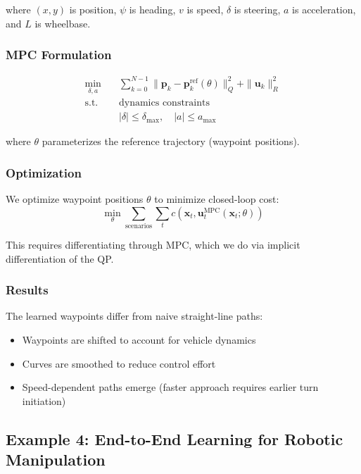 where $(x, y)$ is position, $\psi$ is heading, $v$ is speed, $\delta$ is steering, $a$ is acceleration, and $L$ is wheelbase.

\subsubsection{MPC Formulation}

\begin{equation}
\begin{aligned}
\min_{\delta, a} \quad & \sum_{k=0}^{N-1} \| \mathbf{p}_k - \mathbf{p}_k^{\text{ref}}(\theta) \|^2_Q + \| \mathbf{u}_k \|^2_R \\
\text{s.t.} \quad & \text{dynamics constraints} \\
& |\delta| \leq \delta_{\max}, \quad |a| \leq a_{\max}
\end{aligned}
\end{equation}

where $\theta$ parameterizes the reference trajectory (waypoint positions).

\subsubsection{Optimization}

We optimize waypoint positions $\theta$ to minimize closed-loop cost:
\begin{equation}
\min_\theta \sum_{\text{scenarios}} \sum_{t} c(\mathbf{x}_t, \mathbf{u}_t^{\text{MPC}}(\mathbf{x}_t; \theta))
\end{equation}

This requires differentiating through MPC, which we do via implicit differentiation of the QP.

\subsubsection{Results}

The learned waypoints differ from naive straight-line paths:
\begin{itemize}
    \item Waypoints are shifted to account for vehicle dynamics
    \item Curves are smoothed to reduce control effort
    \item Speed-dependent paths emerge (faster approach requires earlier turn initiation)
\end{itemize}

\subsection{Example 4: End-to-End Learning for Robotic Manipulation}

